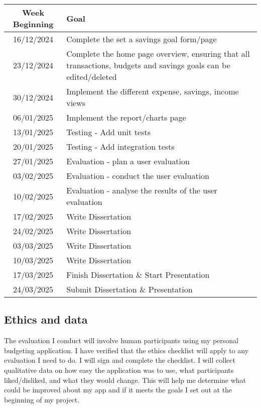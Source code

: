 \documentclass[11pt]{article}
\begin{document}
\begin{tabular}{|c|p{13cm}|}
    \hline
    Week Beginning & Goal \\ \hline
    16/12/2024 & Complete the set a savings goal form/page \\ \hline
    23/12/2024 & Complete the home page overview, ensuring that all transactions, budgets and savings goals can be edited/deleted \\ \hline
    30/12/2024 & Implement the different expense, savings, income views \\ \hline
    06/01/2025 & Implement the report/charts page \\ \hline
    13/01/2025 & Testing - Add unit tests \\ \hline
    20/01/2025 & Testing - Add integration tests \\ \hline
    27/01/2025 & Evaluation - plan a user evaluation \\ \hline
    03/02/2025 & Evaluation - conduct the user evaluation \\ \hline
    10/02/2025 & Evaluation - analyse the results of the user evaluation \\ \hline
    17/02/2025 & Write Dissertation \\ \hline
    24/02/2025 & Write Dissertation \\ \hline
    03/03/2025 & Write Dissertation \\ \hline
    10/03/2025 & Write Dissertation \\ \hline
    17/03/2025 & Finish Dissertation \& Start Presentation \\ \hline
    24/03/2025 & Submit Dissertation \& Presentation \\ \hline
\end{tabular}

    

    
\subsection{Ethics and data}\label{ethics}
The evaluation I conduct will involve human participants using my personal budgeting application. I have verified that the ethics checklist will apply to any evaluation I need to do. I will sign and complete the checklist. I will collect qualitative data on how easy the application was to use, what participants liked/disliked, and what they would change. This will help me determine what could be improved about my app and if it meets the goals I set out at the beginning of my project.
\end{document}
